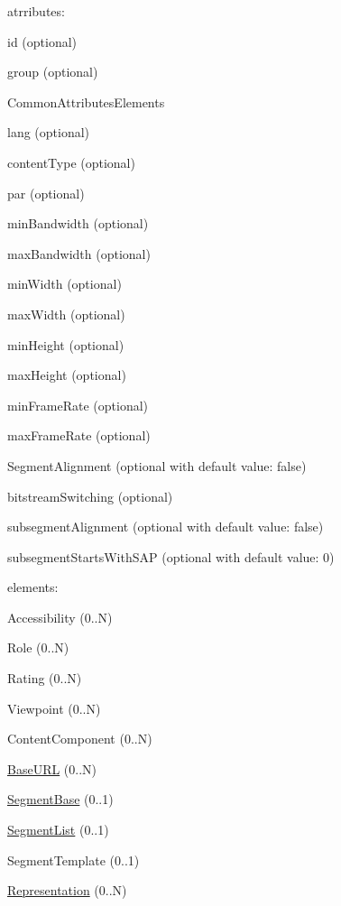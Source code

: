 \begin{DoxyItemize}
\item atrributes\-:
\begin{DoxyEnumerate}
\item id (optional)
\item group (optional)
\item Common\-Attributes\-Elements
\item lang (optional)
\item content\-Type (optional)
\item par (optional)
\item min\-Bandwidth (optional)
\item max\-Bandwidth (optional)
\item min\-Width (optional)
\item max\-Width (optional)
\item min\-Height (optional)
\item max\-Height (optional)
\item min\-Frame\-Rate (optional)
\item max\-Frame\-Rate (optional)
\item Segment\-Alignment (optional with default value\-: false)
\item bitstream\-Switching (optional)
\item subsegment\-Alignment (optional with default value\-: false)
\item subsegment\-Starts\-With\-S\-A\-P (optional with default value\-: 0)
\end{DoxyEnumerate}
\item elements\-:
\begin{DoxyEnumerate}
\item Accessibility (0..N)
\item Role (0..N)
\item Rating (0..N)
\item Viewpoint (0..N)
\item Content\-Component (0..N)
\item \hyperlink{class_base_u_r_l}{Base\-U\-R\-L} (0..N)
\item \hyperlink{class_segment_base}{Segment\-Base} (0..1)
\item \hyperlink{class_segment_list}{Segment\-List} (0..1)
\item Segment\-Template (0..1)
\item \hyperlink{class_representation}{Representation} (0..N) 
\end{DoxyEnumerate}
\end{DoxyItemize}

